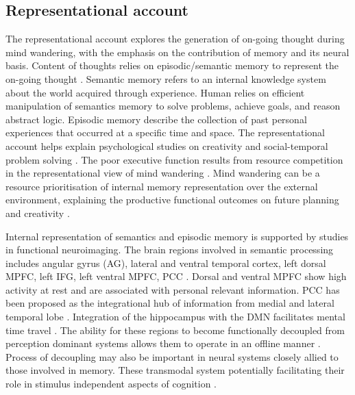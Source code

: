 \subsection{Representational account}

The representational account explores the generation of on-going thought during mind wandering, with the emphasis on the contribution of memory and its neural basis. Content of thoughts relies on episodic/semantic memory to represent the on-going thought \cite{Binder2009,Gusnard2001}. Semantic memory refers to an internal knowledge system about the world acquired through experience. Human relies on efficient manipulation of semantics memory to solve problems, achieve goals, and reason abstract logic. Episodic memory describe the collection of past personal experiences that occurred at a specific time and space. The representational account helps explain psychological studies on creativity \cite{Baird2012,Smeekens2016} and social-temporal problem solving \cite{RubyPlos2013,PoerioFrontiers2016,Medea2016}. The poor executive function results from resource competition in the representational view of mind wandering \cite{SmallwoodSchooler2006}. Mind wandering can be a resource prioritisation of internal memory representation over the external environment, explaining the productive functional outcomes on future planning \cite{Baird2011} and creativity \cite{Baird2012}. 

Internal representation of semantics and episodic memory is supported by studies in functional neuroimaging. The brain regions involved in semantic processing includes angular gyrus (AG), lateral and ventral temporal cortex, left dorsal MPFC, left IFG, left ventral MPFC, PCC \cite<see meta-analysis from >{Binder2009}. Dorsal and ventral MPFC show high activity at rest and are associated with personal relevant information\cite{Gusnard2001}. PCC has been proposed as the integrational hub of information from medial and lateral temporal lobe \cite{Smallwood2016}.  Integration of the hippocampus with the DMN facilitates mental time travel \cite{Karapanagiotidis2017}. The ability for these regions to become functionally decoupled from perception dominant systems allows them to operate in an offline manner \cite{Smallwood2013,Schooler2011}. Process of decoupling may also be important in neural systems closely allied to those involved in memory. These transmodal system potentially facilitating their role in stimulus independent aspects of cognition \cite{Buckner2013,Margulies2016,Mesulam1998}.

